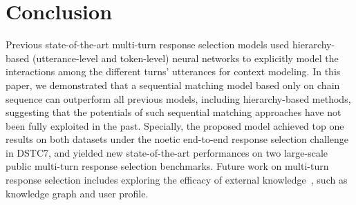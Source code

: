 \documentclass[letterpaper]{article} \usepackage{aaai19}  \usepackage{times}  \usepackage{helvet}  \usepackage{courier}  \usepackage{url}  \usepackage{graphicx}
\begin{document}
\section{Conclusion}
Previous state-of-the-art multi-turn response selection models used hierarchy-based (utterance-level and token-level) neural networks  to explicitly model the interactions among the different turns' utterances for context modeling. In this paper, we demonstrated that a sequential matching model based only on chain sequence can outperform all previous models, including hierarchy-based methods, suggesting that the potentials of such sequential matching approaches have not been fully exploited in the past. Specially, the proposed model achieved top one results on both datasets under the noetic end-to-end response selection challenge in DSTC7, and yielded new state-of-the-art performances on two large-scale public multi-turn response selection benchmarks. Future work on multi-turn response selection includes exploring the efficacy of external knowledge~\cite{DBLP:conf/acl/InkpenZLCW18}, such as knowledge graph and user profile. 



\end{document}
